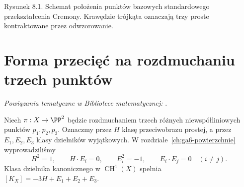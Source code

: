 \begin{center}

{\small Rysunek 8.1. Schemat położenia punktów bazowych
standardowego przekształcenia Cremony. Krawędzie trójkąta
oznaczają trzy proste kontraktowane przez odwzorowanie.}\par
\end{center}

\section{Forma przecięć na rozdmuchaniu trzech punktów}
\label{sec:ga8-classes}

\noindent\emph{Powiązania tematyczne w Bibliotece matematycznej:} .


Niech $\pi:X\to\PP^2$ będzie rozdmuchaniem
trzech różnych niewspółliniowych punktów $p_1,p_2,p_3$.
Oznaczmy przez $H$ klasę przeciwobrazu prostej,
a przez $E_1,E_2,E_3$ klasy dzielników wyjątkowych.
W rozdziale~\ref{ch:ga6-powierzchnie} wyprowadziliśmy
\[
H^2=1,\qquad H\cdot E_i=0,\qquad
E_i^2=-1,\qquad E_i\cdot E_j=0\quad(i\ne j).
\]
Klasa dzielnika kanonicznego w $\operatorname{CH}^1(X)$ spełnia
$[K_X]=-3H+E_1+E_2+E_3$.


